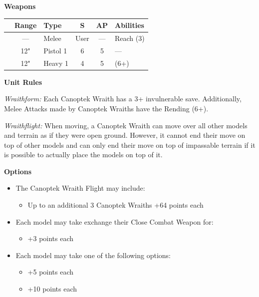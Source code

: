 \begin{minipage}[t]{0.72\textwidth}
	\vspace*{2em}
	\textbf{Weapons}
	
	\begin{tabular}{L{90 pt} c C{40pt} *{2}{c} >{\raggedright\arraybackslash}p{130pt}}
		& Range & Type & S & AP & Abilities \\
		\hline
		 & — & Melee & User & — & Reach (3) \\
		 & 12" & Pistol 1 & 6 & 5 & — \\
		 & 12" & Heavy 1 & 4 & 5 &  (6+) \\
	\end{tabular}
	
	\vspace*{2em}
	\textbf{Unit Rules}
	
	\textit{Wraithform:} Each Canoptek Wraith has a 3+ invulnerable save. Additionally, Melee Attacks made by Canoptek Wraiths have the Rending (6+).
	
	\textit{Wraithflight:} When moving, a Canoptek Wraith can move over all other models and terrain as if they were open ground. However, it cannot end their move on top of other models and can only end their move on top of impassable terrain if it is possible to actually place the models on top of it.	
	
	\vspace*{2em}
	\textbf{Options}
	\begin{itemize}
		\item The Canoptek Wraith Flight may include:
		\begin{itemize}
			\item Up to an additional 3 Canoptek Wraiths \dotfill +64 points each
		\end{itemize}
		\item Each model may take exchange their Close Combat Weapon for:
		\begin{itemize}
			\item {} \dotfill +3 points each
		\end{itemize}
		\item Each model may take one of the following options:
		\begin{itemize}
			\item {} \dotfill +5 points each
			\item {} \dotfill +10 points each
		\end{itemize}
	\end{itemize}
\end{minipage}


